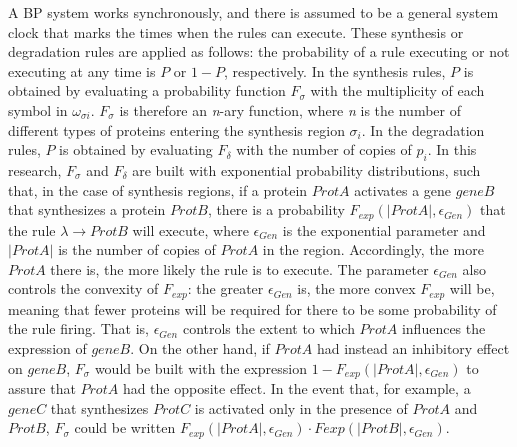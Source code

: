 \documentclass[runningheads,a4paper]{llncs}
\begin{document}
  A BP system works synchronously, and there is assumed to be a general system
  clock that marks the times when the rules can execute. These synthesis or
  degradation rules are applied as follows: the probability of a rule executing
  or not executing at any time is $P$ or $1-P$, respectively. In the synthesis
  rules, $P$ is obtained by evaluating a probability function $F_\sigma$ with
  the multiplicity of each symbol in $\omega_{\sigma i}$. $F_\sigma$ is
  therefore an \textit{n}-ary function, where \textit{n} is the number of
  different types of proteins entering the synthesis region $\sigma_i$. In the
  degradation rules, $P$ is obtained by evaluating $F_\delta$ with the number
  of copies of $p_i$. In this research, $F_\sigma$ and $F_\delta$ are built
  with exponential probability distributions, such that, in the case of
  synthesis regions, if a protein $ProtA$ activates a gene $geneB$ that
  synthesizes a protein $ProtB$, there is a probability $F_{exp}(|ProtA|,
  \epsilon_{Gen})$ that the rule $\lambda \rightarrow ProtB$ will execute,
  where $\epsilon_{Gen}$ is the exponential parameter
  and $|ProtA|$ is the number
  of copies of $ProtA$ in the region. Accordingly, the more $ProtA$ there is, the
  more likely the rule is to execute. The parameter $\epsilon_{Gen}$ also
  controls the convexity of $F_{exp}$: the greater $\epsilon_{Gen}$ is, the more
  convex $F_{exp}$ will be, meaning that fewer proteins will be required for
  there to be some probability of the rule firing. That is, $\epsilon_{Gen}$
  controls the extent to which $ProtA$ influences the expression of $geneB$. On
  the other hand, if $ProtA$ had instead an inhibitory effect on $geneB$,
  $F_\sigma$ would be built with the expression $1-F_{exp}(|ProtA|,
  \epsilon_{Gen})$ to assure that $ProtA$ had the opposite effect. In the event
  that, for example, a $geneC$ that synthesizes $ProtC$ is activated only in the
  presence of $ProtA$ and $ProtB$, $F_\sigma$ could be written $F_{exp}(|ProtA|,
  \epsilon_{Gen}) \cdot F{exp}(|ProtB|, \epsilon_{Gen})$.
\end{document}
